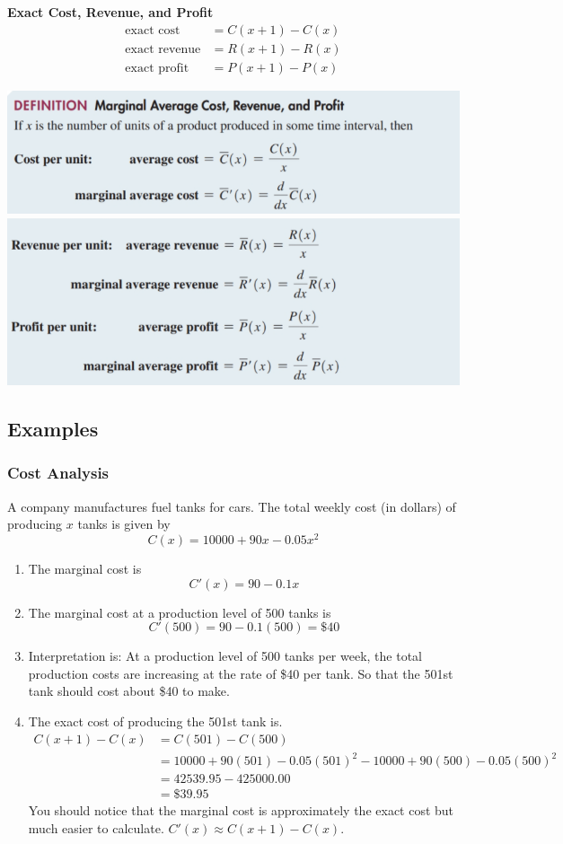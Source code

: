 \documentclass[14pt]{extarticle}
\begin{document}
\begin{tcolorbox}[enhanced jigsaw,colback=bg,boxrule=0pt,arc=0pt]
	\textbf{Exact Cost, Revenue, and Profit}
	\begin{align*}
		\text{exact cost} &= C(x+1)-C(x) \\
		\text{exact revenue} &= R(x+1) - R(x) \\
		\text{exact profit} &= P(x+1) - P(x)
	\end{align*}
\end{tcolorbox}
\begin{center}
	\includegraphics[width=0.9\linewidth]{9-7-2}
	\includegraphics[width=0.9\linewidth]{9-7-3}
\end{center}



\subsection{Examples}
\subsubsection{Cost Analysis}
A company manufactures fuel tanks for cars. The total weekly cost (in dollars) of producing $x$ tanks is given by
$$C(x) = 10000+ 90x- 0.05x^2$$
\begin{enumerate}
	\item The marginal cost is $$C'(x)= 90-0.1x$$
	\item The marginal cost at a production level of 500 tanks is $$C'(500)= 90 -0.1(500) = \$40$$
	\item Interpretation is: At a production level of 500 tanks per week, the total production costs are increasing at the rate of \$40 per tank. So that the 501st tank should cost about \$40 to make.
	\item The exact cost of producing the 501st tank is. 
	\begin{align*}
		C(x+1)-C(x) &= C(501)-C(500) \\
		&= 10000 +90(501) - 0.05(501)^2 - 10000 + 90(500) - 0.05(500)^2 \\
		&= 42539.95 - 425000.00 \\
		&= \$39.95
	\end{align*} 
	You should notice that the marginal cost is approximately the exact cost but much easier to calculate. $C'(x) \approx C(x+1)-C(x)$.
\end{enumerate}
\end{document}
